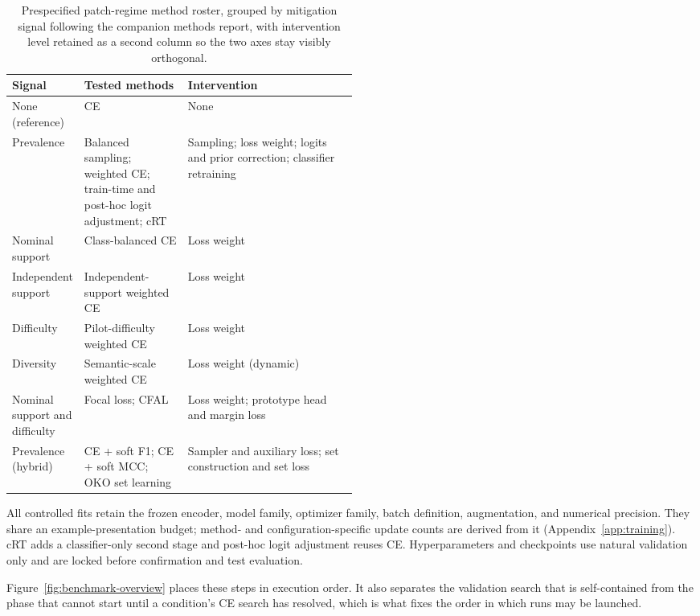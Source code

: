 \documentclass[11pt]{article}
\begin{document}
\begin{table}[H]
  \centering
  \scriptsize
  \begin{tabularx}{\linewidth}{@{}>{\raggedright\arraybackslash}p{0.20\linewidth}>{\raggedright\arraybackslash}p{0.30\linewidth}X@{}}
    \toprule
    Signal & Tested methods & Intervention \\
    \midrule
    None (reference) & CE & None \\
    Prevalence & Balanced sampling; weighted CE; train-time and post-hoc logit adjustment; cRT & Sampling; loss weight; logits and prior correction; classifier retraining \\
    Nominal support & Class-balanced CE & Loss weight \\
    Independent support & Independent-support weighted CE & Loss weight \\
    Difficulty & Pilot-difficulty weighted CE & Loss weight \\
    Diversity & Semantic-scale weighted CE & Loss weight (dynamic) \\
    Nominal support and difficulty & Focal loss; CFAL & Loss weight; prototype head and margin loss \\
    Prevalence (hybrid) & CE + soft F1; CE + soft MCC; OKO set learning & Sampler and auxiliary loss; set construction and set loss \\
    \bottomrule
  \end{tabularx}
  \caption{Prespecified patch-regime method roster, grouped by mitigation signal following the companion methods report, with intervention level retained as a second column so the two axes stay visibly orthogonal.}
  \label{tab:roster}
\end{table}

All controlled fits retain the frozen encoder, model family, optimizer family, batch definition, augmentation, and numerical precision. They share an example-presentation budget; method- and configuration-specific update counts are derived from it (Appendix~\ref{app:training}). cRT adds a classifier-only second stage and post-hoc logit adjustment reuses CE. Hyperparameters and checkpoints use natural validation only and are locked before confirmation and test evaluation.

Figure~\ref{fig:benchmark-overview} places these steps in execution order. It also separates the validation search that is self-contained from the phase that cannot start until a condition's CE search has resolved, which is what fixes the order in which runs may be launched.
\end{document}
